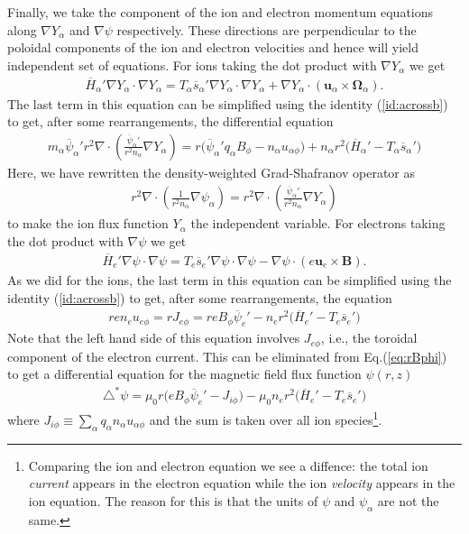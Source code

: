 \documentclass[11pt, reqno]{amsart}
\newcommand{\eqr}[1]{Eq.\thinspace(#1)}
\newcommand{\mvec}[1]{\mathbf{#1}}
\theoremstyle{definition}
\begin{document}
Finally, we take the component of the ion and electron momentum
equations along $\nabla Y_\alpha$ and $\nabla \psi$
respectively. These directions are perpendicular to the poloidal
components of the ion and electron velocities and hence will yield
independent set of equations. For ions taking the dot product with
$\nabla Y_\alpha$ we get
\begin{align}
  \overline{H}_\alpha' \nabla Y_\alpha \cdot \nabla Y_\alpha
  = T_\alpha \overline{s}_\alpha' \nabla Y_\alpha \cdot \nabla Y_\alpha
  +
  \nabla Y_\alpha \cdot (\mvec{u}_\alpha\times\mvec{\Omega}_\alpha).
\end{align}
The last term in this equation can be simplified using the identity
(\ref{id:acrossb}) to get, after some rearrangements, the differential
equation
\begin{align}
  m_\alpha\overline{\psi}_\alpha' 
  r^2\nabla\cdot
  \left(
    \frac{\overline{\psi}_\alpha'}{r^2 n_\alpha}\nabla Y_\alpha
  \right)
  =
  r\big(
  \overline{\psi}_\alpha' q_\alpha  B_\phi - n_\alpha u_{\alpha\phi}
  \big)
  + n_\alpha r^2 \big(
  \overline{H}_\alpha' - T_\alpha \overline{s}_\alpha'
  \big)
\end{align}
Here, we have rewritten the density-weighted Grad-Shafranov operator
as
\begin{align}
  r^2\nabla\cdot\left(\frac{1}{r^2 n_\alpha}\nabla\psi_\alpha\right)
  =
  r^2\nabla\cdot
  \left(
    \frac{\overline{\psi}_\alpha'}{r^2 n_\alpha}\nabla Y_\alpha
  \right)
\end{align}
to make the ion flux function $Y_\alpha$ the independent variable. For
electrons taking the dot product with $\nabla \psi$ we get
\begin{align}
  \overline{H}_e' \nabla \psi \cdot \nabla \psi
  = T_e \overline{s}_e' \nabla \psi \cdot \nabla \psi
  -
  \nabla \psi \cdot ( e \mvec{u}_e\times\mvec{B}).
\end{align}
As we did for the ions, the last term in this equation can be
simplified using the identity (\ref{id:acrossb}) to get, after some
rearrangements, the equation
\begin{align}
  r en_e u_{e\phi} = r J_{e\phi} =
  reB_\phi\overline{\psi}_e'
  -
  n_e r^2
  \big(
  \overline{H}_e' - T_e \overline{s}_e'  
  \big)
\end{align}
Note that the left hand side of this equation involves $J_{e\phi}$,
i.e., the toroidal component of the electron current. This can be
eliminated from \eqr{\ref{eq:rBphi}} to get a differential equation
for the magnetic field flux function $\psi(r,z)$
\begin{align}
  \triangle^*\psi
  =
  \mu_0 r 
  \big(
  e B_\phi \overline{\psi}_e' - J_{i\phi}
  \big)
  -
  \mu_0 n_e r^2
  \big(
  \overline{H}_e' - T_e \overline{s}_e'
  \big)
\end{align}
where $J_{i\phi} \equiv \sum_\alpha q_\alpha n_\alpha u_{\alpha\phi}$
and the sum is taken over all ion species\footnote{Comparing the ion
  and electron equation we see a diffence: the total ion
  \emph{current} appears in the electron equation while the ion
  \emph{velocity} appears in the ion equation. The reason for this is
  that the units of $\psi$ and $\psi_\alpha$ are not the same.}.
\end{document}
